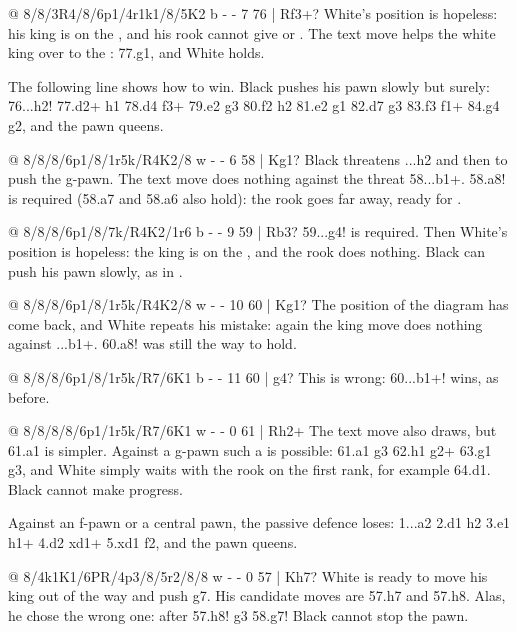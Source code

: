 @ 8/8/3R4/8/6p1/4r1k1/8/5K2 b - - 7 76 | Rf3+?
White's position is hopeless: his king is on the , and his rook cannot give
 or . The text
move helps the white king over to the : 77.\K g1, and White holds.

The following line shows how to win. Black pushes his pawn slowly but surely: 76...\K h2!
77.\R d2+ \K h1 78.\R d4 \R f3+ 79.\K e2 \R g3 80.\K f2 \K h2 81.\K e2 \R g1 82.\R d7 g3 83.\K f3
\R f1+ 84.\K g4 g2, and the pawn queens.

@ 8/8/8/6p1/8/1r5k/R4K2/8 w - - 6 58 | Kg1?
Black threatens ...\K h2 and then to push the g-pawn. The text move does nothing against the threat
58...\R b1+. 58.\R a8! is required (58.\R a7 and 58.\R a6 also hold): the rook goes far away, ready
for .

@ 8/8/8/6p1/8/7k/R4K2/1r6 b - - 9 59 | Rb3?
59...g4! is required. Then White's position is hopeless: the king is on the , and
the rook does nothing. Black can push his pawn slowly, as in .

@ 8/8/8/6p1/8/1r5k/R4K2/8 w - - 10 60 | Kg1?
The position of the diagram has come back, and White repeats his mistake: again the king move does
nothing against ...\R b1+. 60.\R a8! was still the way to hold.

@ 8/8/8/6p1/8/1r5k/R7/6K1 b - - 11 60 | g4?
This is wrong: 60...\R b1+! wins, as before.

@ 8/8/8/8/6p1/1r5k/R7/6K1 w - - 0 61 | Rh2+
The text move also draws, but 61.\R a1 is simpler. Against a g-pawn such a
 is possible:
61.\R a1 g3 62.\K h1 g2+ 63.\K g1 \K g3, and White simply waits with the rook on the first rank,
for example 64.\R d1. Black cannot make progress.

Against an f-pawn or a central pawn, the passive defence loses:
1...\R a2 2.\R d1 \R h2 3.\K e1 \R h1+ 4.\K d2 \R xd1+ 5.\K xd1 f2, and the pawn queens.

@ 8/4k1K1/6PR/4p3/8/5r2/8/8 w - - 0 57 | Kh7?
White is ready to move his king out of the way and push g7. His candidate moves are 57.\K h7 and
57.\K h8. Alas, he chose the wrong one: after 57.\K h8! \R g3 58.g7! Black cannot stop the pawn.

